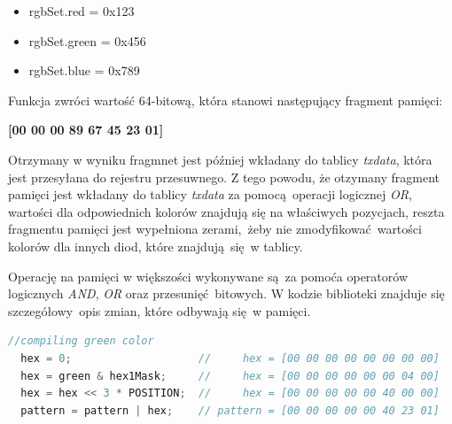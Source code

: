 \documentclass[eng,printmode]{mgr}
\begin{document}
\begin{itemize}
  \item{rgbSet.red   = 0x123}
  \item{rgbSet.green = 0x456}
  \item{rgbSet.blue  = 0x789}
\end{itemize}
             
Funkcja zwróci wartość 64-bitową, która stanowi następujący fragment pamięci:

\vspace{0.3cm}
\hspace{0.3cm} \textbf{[00 00 00 89 67 45 23 01]}
\vspace{0.3cm}

Otrzymany w wyniku fragmnet jest później wkładany do tablicy \emph{txdata}, która jest przesyłana do rejestru przesuwnego. Z tego powodu, że otzymany fragment pamięci jest wkładany do tablicy \emph{txdata} za pomocą operacji logicznej \emph{OR}, wartości dla odpowiednich kolorów znajdują się na właściwych pozycjach, reszta fragmentu pamięci jest wypełniona zerami, żeby nie zmodyfikować wartości kolorów dla innych diod, które znajdują się w tablicy.

Operację na pamięci w większości wykonywane są za pomoća operatorów logicznych \emph{AND}, \emph{OR} oraz przesunięć bitowych. W kodzie biblioteki znajduje się szczegółowy opis zmian, które odbywają się w pamięci.

\vspace{0.3cm}
\begin{lstlisting}[language=c,frame=single,caption={Fragment kodu, w którym przedstawiony jest komentarz ilustrujący efekt wykonywania operacji na pamięci}]
  //compiling green color     
  hex = 0;                    //     hex = [00 00 00 00 00 00 00 00]
  hex = green & hex1Mask;     //     hex = [00 00 00 00 00 00 04 00]
  hex = hex << 3 * POSITION;  //     hex = [00 00 00 00 00 40 00 00]
  pattern = pattern | hex;    // pattern = [00 00 00 00 00 40 23 01]

\end{lstlisting}

\end{document}
